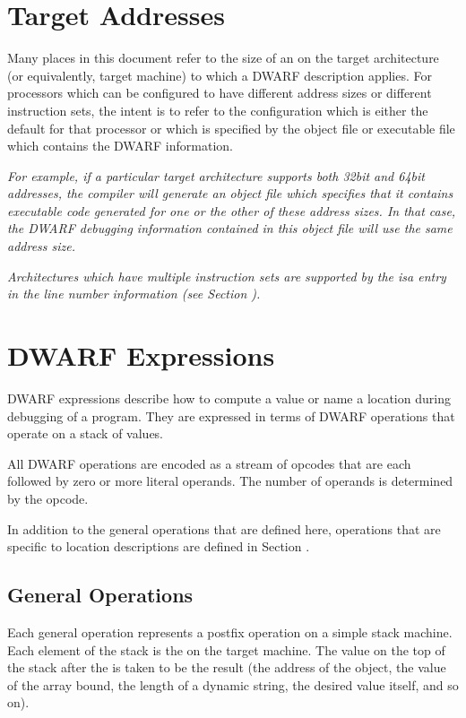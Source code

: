 \section{Target Addresses}
\label{chap:targetaddresses}
Many places in this document 
refer
to the size 
of an
on the target architecture (or equivalently, target machine)
to which a DWARF description applies. For processors which
can be configured to have different address sizes or different
instruction sets, the intent is to refer to the configuration
which is either the default for that processor or which is
specified by the object file or executable file which contains
the DWARF information.

\textit{%
For example, if a particular target architecture supports
both 32\dash bit and 64\dash bit addresses, the compiler will generate
an object file which specifies that it contains executable
code generated for one or the other of these 
address sizes. In
that case, the DWARF debugging information contained in this
object file will use the same address size.
}

\textit{%
Architectures which have multiple instruction sets are
supported by the isa entry in the line number information
(see Section ).
}

\section{DWARF Expressions}
\label{chap:dwarfexpressions}
DWARF expressions describe how to compute a value or name a
location during debugging of a program. 
They are expressed in
terms of DWARF operations that operate on a stack of values.

All DWARF operations are encoded as a stream of opcodes that
are each followed by zero or more literal operands. 
The number
of operands is determined by the opcode.  

In addition to the
general operations that are defined here, operations that are
specific to location descriptions are defined in 
Section .

\subsection{General Operations}
\label{chap:generaloperations}
Each general operation represents a postfix operation on
a simple stack machine. Each element of the stack is the
 on the target machine. 
The value on the
top of the stack after  the 
is 
taken to be the result (the address of the object, the
value of the array bound, the length of a dynamic string,
the desired value itself, and so on).

